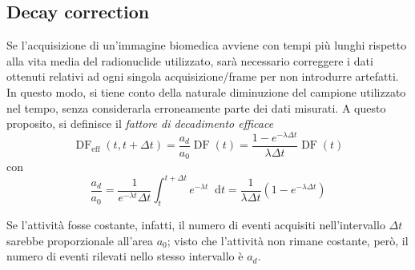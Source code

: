 \documentclass[11pt, a4paper]{scrartcl}
\theoremstyle{style}
\theoremstyle{style1}
\newcommand{\dd}{\mathop{}\!\mathrm{d}}
\numberwithin{equation}{subsection}
\begin{document}
\subsection{Decay correction}
Se l'acquisizione di un'immagine biomedica avviene con tempi pi\`u lunghi rispetto alla vita media del radionuclide utilizzato, sar\`a necessario correggere i dati ottenuti relativi ad ogni singola acquisizione/frame per non introdurre artefatti. 
In questo modo, si tiene conto della naturale diminuzione del campione utilizzato nel tempo, senza considerarla erroneamente parte dei dati misurati.
A questo proposito, si definisce il \textit{fattore di decadimento efficace} 
\begin{equation}
	\operatorname{DF} _\text{eff}(t,t+\Delta t) = \frac{a_d}{a_0}\operatorname{DF} (t) = \frac{1-e^{-\lambda \Delta t}}{\lambda \Delta t} \operatorname{DF} (t)
\end{equation}
con 
\[
\frac{a_d}{a_0} = \frac{1}{e^{-\lambda t}\Delta t} \int _t ^{t+\Delta t} e^{-\lambda t} \dd t = \frac{1}{\lambda \Delta t} \left(1 - e^{-\lambda \Delta  t}\right) 
\] 
\begin{center}
	\begin{minipage}
		{.55\columnwidth}
	Se l'attivit\`a fosse costante, infatti, il numero di eventi acquisiti nell'intervallo $\Delta t$ sarebbe proporzionale all'area $a_0$; visto che l'attivit\`a non rimane costante, per\`o, il numero di eventi rilevati nello stesso intervallo \`e $a_d$.
	\end{minipage}
	\hfill
	\begin{minipage}
		{.4\columnwidth}
	\centering
	\end{minipage}
\end{center}
\end{document}
